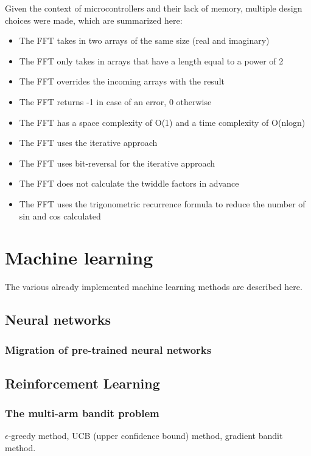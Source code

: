 \documentclass{book}
\begin{document}
Given the context of microcontrollers and their lack of memory, multiple design choices were made, which are summarized here:
\begin{itemize}
	\item The FFT takes in two arrays of the same size (real and imaginary)
	\item The FFT only takes in arrays that have a length equal to a power of 2
	\item The FFT overrides the incoming arrays with the result
	\item The FFT returns -1 in case of an error, 0 otherwise
	\item The FFT has a space complexity of O(1) and a time complexity of O(nlogn)
	\item The FFT uses the iterative approach
	\item The FFT uses bit-reversal for the iterative approach
	\item The FFT does not calculate the twiddle factors in advance
	\item The FFT uses the trigonometric recurrence formula to reduce the number of sin and cos calculated
\end{itemize}


\chapter{Machine learning}

The various already implemented machine learning methods are described here.

\section{Neural networks}

\subsection{Migration of pre-trained neural networks}


\section{Reinforcement Learning}

\subsection{The multi-arm bandit problem}

$\epsilon$-greedy method, UCB (upper confidence bound) method, gradient bandit method.
\end{document}
